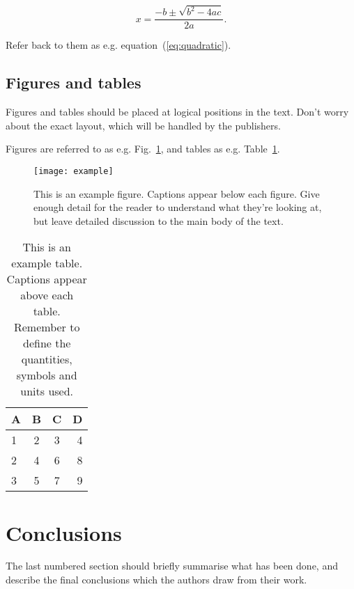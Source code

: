 \documentclass[fleqn,usenatbib]{mnras}
\begin{document}
\begin{equation}
    x=\frac{-b\pm\sqrt{b^2-4ac}}{2a}.
	\label{eq:quadratic}
\end{equation}

Refer back to them as e.g. equation~(\ref{eq:quadratic}).

\subsection{Figures and tables}

Figures and tables should be placed at logical positions in the text. Don't
worry about the exact layout, which will be handled by the publishers.

Figures are referred to as e.g. Fig.~\ref{fig:example_figure}, and tables as
e.g. Table~\ref{tab:example_table}.

\begin{figure}
	\texttt{[image: example]}
    \caption{This is an example figure. Captions appear below each figure.
	Give enough detail for the reader to understand what they're looking at,
	but leave detailed discussion to the main body of the text.}
    \label{fig:example_figure}
\end{figure}

\begin{table}
	\centering
	\caption{This is an example table. Captions appear above each table.
	Remember to define the quantities, symbols and units used.}
	\label{tab:example_table}
	\begin{tabular}{lccr} %
		\hline
		A & B & C & D\\
		\hline
		1 & 2 & 3 & 4\\
		2 & 4 & 6 & 8\\
		3 & 5 & 7 & 9\\
		\hline
	\end{tabular}
\end{table}


\section{Conclusions}

The last numbered section should briefly summarise what has been done, and describe
the final conclusions which the authors draw from their work.
\end{document}
